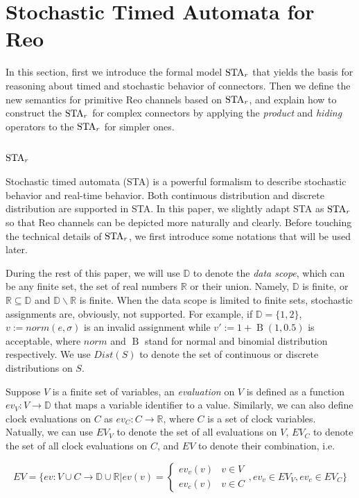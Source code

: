 \section{Stochastic Timed Automata for Reo}
\label{sec:semantics}

In this section, first we introduce the formal model $\mbox{STA}_r$ that yields the basis for reasoning about timed and stochastic behavior of connectors. Then we define the new semantics for primitive Reo channels based on $\mbox{STA}_r$, and explain how to construct the $\mbox{STA}_r$ for complex connectors by applying the \emph{product} and \emph{hiding} operators to the $\mbox{STA}_r$ for simpler ones.
\subsection{$\mbox{STA}_r$}

Stochastic timed automata (STA) \cite{HahnHH14} is a powerful formalism to describe stochastic behavior and real-time behavior. Both continuous distribution and discrete distribution are supported in STA. In this paper, we slightly adapt STA as $\mbox{STA}_r$ so that Reo channels can be depicted more naturally and clearly.
Before touching the technical details of $\mbox{STA}_r$, we first introduce some notations that will be used later.

During the rest of this paper, we will use $\mathbb{D}$ to denote the \emph{data scope}, which can be any finite set, the set of real numbers $\mathbb{R}$ or their union. Namely, $\mathbb{D}$ is finite, or $\mathbb{R}\subseteq \mathbb{D}$ and $\mathbb{D}\backslash \mathbb{R}$ is finite. When the data scope is limited to finite sets, stochastic assignments are, obviously, not supported. For example, if $\mathbb{D}=\{1,2\}$, $v:=norm(e,\sigma)$ is an invalid assignment while $v':=1+\operatorname{B}(1, 0.5)$ is acceptable, where $norm$ and $\operatorname{B}$ stand for normal and binomial distribution respectively. We use $Dist(S)$ to denote the set of continuous or discrete distributions on $S$.

\begin{definition}[Evaluations]
Suppose $V$ is a finite set of variables, an \emph{evaluation} on $V$ is defined as a function $ev_V:V\rightarrow \mathbb{D}$ that maps a variable identifier to a value. Similarly, we can also define clock evaluations on $C$ as $ev_C:C\rightarrow \mathbb{R}$, where $C$ is a set of clock variables. Natually, we can use $EV_V$ to denote the set of all evaluations on $V$, $EV_C$ to denote the set of all clock evaluations on $C$, and $EV$ to denote their combination, i.e. 

\begin{displaymath}
    EV=\Bigg\{ev:V\cup C\rightarrow \mathbb{D}\cup\mathbb{R}|
    ev(v)=
    \left\{
        \begin{array}{lr}
            ev_v(v) & v\in V \\
            ev_c(v) & v\in C
        \end{array}
    \right.
    , ev_v\in EV_V, ev_c\in EV_C
    \Bigg\}
\end{displaymath}

\end{definition}

